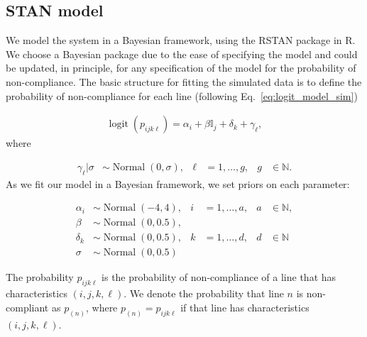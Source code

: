 \documentclass[useAMS,usenatbib,referee]{biom}
\DeclareMathOperator{\logit}{logit}
\DeclareMathOperator{\Normal}{Normal}
\begin{document}
\subsection{STAN model}
We model the system in a Bayesian framework, using the RSTAN package in R. We choose a Bayesian package due to the ease of specifying the model and could be updated, in principle, for any specification of the model for the probability of non-compliance. The basic structure for fitting the simulated data is to define the probability of non-compliance for each line (following Eq.~\eqref{eq:logit_model_sim})

\begin{align}
\logit(p_{ijk\ell}) = \alpha_{i} + \beta\mathbb{I}_j + \delta_k + \gamma_\ell, \label{eq:logit_model_fit_sim}
\end{align}
where 

\begin{align}
\gamma_\ell | \sigma &\sim \Normal(0, \sigma), & \ell &= 1,\ldots, g, & g&\in \mathbb{N}.
\end{align}
As we fit our model in a Bayesian framework, we set priors on each parameter:

\begin{align}
\alpha_i &\sim \Normal(-4, 4), & i&=1, \ldots, a, & a&\in \mathbb{N},\\
\beta &\sim \Normal(0, 0.5),\\
\delta_k &\sim \Normal(0, 0.5), & k &= 1,\ldots, d, & d &\in \mathbb{N}\\
\sigma &\sim \Normal(0, 0.5)
\end{align}

The probability $p_{ijk\ell}$ is the probability of non-compliance of a line that has characteristics $(i,j,k,\ell)$. We denote the probability that line $n$ is non-compliant as $p_{(n)}$, where $p_{(n)} = p_{ijk\ell}$ if that line has characteristics $(i,j,k,\ell)$.
\end{document}

